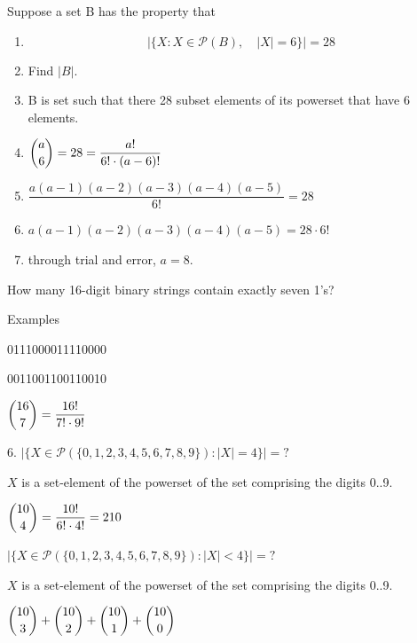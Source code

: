 \documentclass[openany, 11pt]{book}
\begin{document}
\begin{exercise}{}{}
	Suppose a set B has the property that
	\begin{enumerate}[label={\textbullet}, leftmargin=*, itemsep=0pt, parsep=0pt]
		\item $$|\{X: X \in \mathcal{P}(B),\quad|X|=6\}|=28$$
		\item Find $|B|$.
		\item B is set such that there 28 subset elements of its powerset that have
		      6 elements.
		\item $\dbinom{a}{6}=28 = \dfrac{a!}{6!\cdot(a-6)!}$
		\item $\dfrac{a(a-1)(a-2)(a-3)(a-4)(a-5)}{6!}=28$
		\item $a(a-1)(a-2)(a-3)(a-4)(a-5)=28\cdot6!$
		\item through trial and error, $a=8$.
	\end{enumerate}
\end{exercise}

\begin{exercise}{}{}
	How many 16-digit binary strings contain exactly seven 1's?
	\begin{alist}
		\item Examples
		\item 0111000011110000
		\item 0011001100110010
		\item $\dbinom{16}{7}= \dfrac{16!}{7!\cdot9!}$
	\end{alist}
\end{exercise}

\begin{exercise}{}{}
	6. $|\{X \in \mathcal{P}(\{0,1,2,3,4,5,6,7,8,9\}):|X|=4\}|=?$
	\begin{alist}
		\item $X$ is a set-element of the powerset of the set comprising the digits 0..9.
		\item $\dbinom{10}{4}= \dfrac{10!}{6!\cdot4!}=210$
	\end{alist}
\end{exercise}

\begin{exercise}{}{}
	$|\{X \in \mathcal{P}(\{0,1,2,3,4,5,6,7,8,9\}):|X|<4\}|=?$
	\begin{alist}
		\item $X$ is a set-element of the powerset of the set comprising the digits 0..9.
		\item $\dbinom{10}{3} + \dbinom{10}{2} + \dbinom{10}{1} + \dbinom{10}{0}$
	\end{alist}
\end{exercise}
\end{document}
